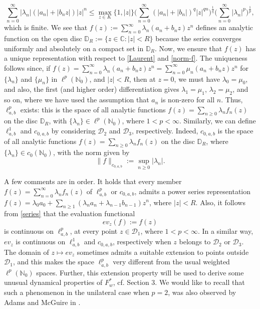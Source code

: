 \documentclass[12pt, reqno]{amsart}
\theoremstyle{definition}
\theoremstyle{remark}
\numberwithin{equation}{section}
\begin{document}
 \begin{equation}\label{series}
    \sum_{n=0}^{\infty} \lvert \lambda_{n}|(|a_{n}|+|b_{n}z|)|z|^{n} \leq \max_{z\in K} \{1, \lvert z\rvert\} \Big( \sum_{n=0}^{\infty}(\lvert a_{n}\rvert+\lvert b_{n}\rvert)^{q}\lvert z \rvert^{qn}\Big)^{\frac{1}{q}} \Big(\sum_{n=0}^{\infty} \lvert\lambda_{n}\rvert^p\Big)^{\frac{1}{p}},
\end{equation}
which is finite. We see that $f(z):=\sum_{n=0}^{\infty} \lambda_{n}(a_{n}+b_{n}z)z^{n}$ defines an analytic function on the open disc $\mathbb{D}_R:=\{z\in \mathbb{C}:|z|<R\}$ because the series converges uniformly and absolutely on a compact set in $\mathbb{D}_R$. Now, we ensure that $f(z)$ has a unique representation with respect to \eqref{Laurent} and \eqref{norm-f}. The uniqueness follows since, if $f(z)=\sum_{n=0}^{\infty} \lambda_{n}(a_{n}+b_{n}z)z^{n}=\sum_{n=0}^{\infty} \mu_{n}(a_{n}+b_{n}z)z^{n}$ for $\{\lambda_n\}$ and $\{\mu_n\}$ in $\ell^p(\mathbb{N}_0)$, and $|z|<R$, then at $z=0$, we must have $\lambda_0=\mu_0$, and also, the first (and higher order) differentiation gives $\lambda_1=\mu_1$, $\lambda_2=\mu_2$, and so on, where we have used the assumption that $a_n$ is non-zero for all $n$. Thus, $\ell^p_{a,b}$ exists: this is the space of all analytic functions $f(z)=\sum_{n\geq 0} \lambda_n f_n(z)$ on the disc $\mathbb{D}_R$, with $\{\lambda_n\}\in \ell^p(\mathbb{N}_0)$, where $1<p<\infty$. Similarly, we can define $\ell^1_{a,b}$ and $c_{0,a,b}$ by considering $\mathcal{D}_2$ and $\mathcal{D}_3$, respectively. Indeed, $c_{0,a,b}$ is the space of all analytic functions $f(z)=\sum_{n\geq 0} \lambda_n f_n(z)$ on the disc $\mathbb{D}_R$, where $\{\lambda_n\}\in c_0(\mathbb{N}_0)$, with the norm given by 
\[
\|f\|_{c_{0,a,b}}:=\sup_{n\geq 0}|\lambda_n|.
\]

 
A few comments are in order. It holds that every member $f(z)=\sum_{n=0}^{\infty}\lambda_n f_n(z)$ of $ \ell^p_{a,b}$ or $c_{0,a,b}$, admits a power series representation $f(z)=\lambda_0a_0+\sum_{n\geq 1} (\lambda_na_n+\lambda_{n-1}b_{n-1})z^n$, where $|z|<R$. Also, it follows from \eqref{series} that the evaluation functional 
\[
ev_z(f):=f(z)
\]
is continuous on $\ell^p_{a,b}$, at every point $z\in \mathcal{D}_1$, where $1<p<\infty$. In a similar way, $ev_z$ is continuous on $\ell^1_{a,b}$ and $c_{0,a,b}$, respectively when $z$ belongs to $\mathcal{D}_2$ or $\mathcal{D}_3$. The domain of $z\mapsto ev_z$ sometimes admits a suitable extension to points outside $\mathcal{D}_1$, and this makes the space $\ell^p_{a,b}$ very different from the usual weighted $\ell^p(\mathbb{N}_{0})$ spaces. Further, this extension property will be used to derive some unusual dynamical properties of $F_w^*$, cf. Section $3$. We would like to recall that such a phenomenon in the unilateral case when $p=2$, was also observed by Adams and McGuire in \cite{Adams-McGuire}. 
\end{document}
